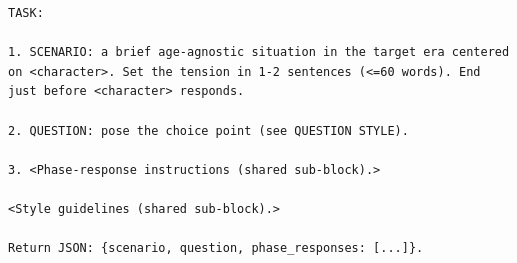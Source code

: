 \documentclass{llmxive}
\begin{document}
\begin{table}[htbp]
\begin{lstlisting}[basicstyle=\ttfamily\scriptsize]
TASK:

1. SCENARIO: a brief age-agnostic situation in the target era centered on <character>. Set the tension in 1-2 sentences (<=60 words). End just before <character> responds.

2. QUESTION: pose the choice point (see QUESTION STYLE).

3. <Phase-response instructions (shared sub-block).>

<Style guidelines (shared sub-block).>

Return JSON: {scenario, question, phase_responses: [...]}.
\end{lstlisting}
\caption{Out-of-World designer (probe type 3). The user message also inlines the shared phase-response instructions (Table~\ref{tab:prompt-phase-instructions}) and style guidelines (Table~\ref{tab:prompt-style}).}
\label{tab:prompt-oow-designer}
\end{table}
\end{document}

